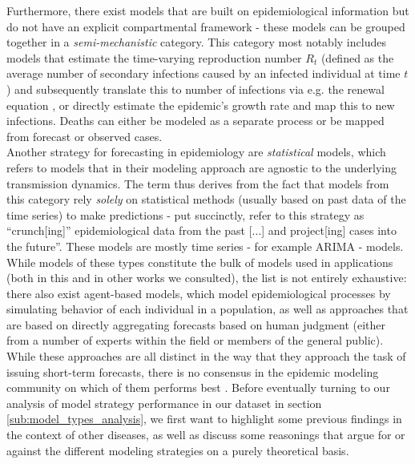Furthermore, there exist models that are built on epidemiological information but do not have an explicit compartmental framework - these models can be grouped together in a \textit{semi-mechanistic} category. This category most notably includes models that estimate the time-varying reproduction number $R_t$ (defined as the average number of secondary infections caused by an infected individual at time $t$) and subsequently translate this to number of infections via e.g. the renewal equation , or directly estimate the epidemic's growth rate and map this to new infections. %
Deaths can either be modeled as a separate process or be mapped from forecast or observed cases. \medskip \\
Another strategy for forecasting in epidemiology are \textit{statistical} models, which %
 refers to models that in their modeling approach are agnostic to the underlying transmission dynamics. The term thus derives from the fact that models from this category rely \textit{solely} on statistical methods (usually based on past data of the time series) to make predictions - put succinctly, \cite{holmdahl_wrong_2020} refer to this strategy as ``crunch[ing]'' epidemiological data from the past [...] and project[ing] cases into the future''. These models are mostly time series - for example ARIMA - models.  \medskip\\
While models of these types constitute the bulk of models used in applications (both in this and in other works we consulted), the list is not entirely exhaustive: there also exist agent-based models, which model epidemiological processes by simulating behavior of each individual in a population, as well as approaches that are based on directly aggregating forecasts based on human judgment (either from a number of experts within the field or members of the general public). \medskip\\
While these approaches are all distinct in the way that they approach the task of issuing short-term forecasts, there is no consensus in the epidemic modeling community on which of them performs best \citep{moran_epidemic_2016}. Before eventually turning to our analysis of model strategy performance in our dataset in section \ref{sub:model_types_analysis}, we first want to highlight some previous findings in the context of other diseases, as well as discuss some reasonings that argue for or against the different modeling strategies on a purely theoretical basis.\\
